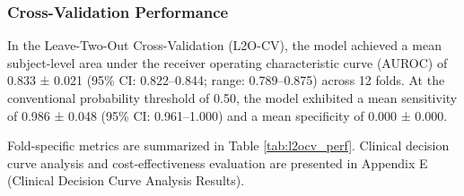 \documentclass[12pt, a4paper]{article}
\begin{document}
\subsubsection{Cross-Validation Performance}
In the Leave-Two-Out Cross-Validation (L2O-CV), the model achieved a mean subject-level area under the receiver operating characteristic curve (AUROC) of 0.833 ± 0.021 (95\% CI: 0.822--0.844; range: 0.789--0.875) across 12 folds. At the conventional probability threshold of 0.50, the model exhibited a mean sensitivity of 0.986 ± 0.048 (95\% CI: 0.961--1.000) and a mean specificity of 0.000 ± 0.000.

Fold-specific metrics are summarized in Table \ref{tab:l2ocv_perf}. Clinical decision curve analysis and cost-effectiveness evaluation are presented in Appendix E (Clinical Decision Curve Analysis Results).

\begin{table}[H]
\centering
\normalsize
\caption{Fold-Level Performance Metrics in L2O-CV Validation}
\label{tab:l2ocv_perf}
\end{table}
\end{document}
